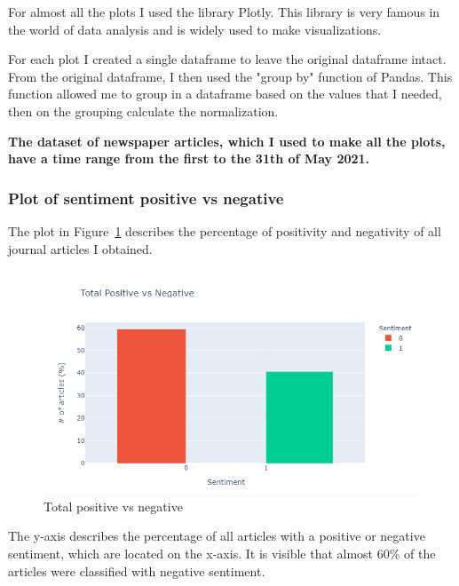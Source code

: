 For almost all the plots I used the library \gls{Plotly}. This library is very famous in the world of data analysis and is widely used to make visualizations. 

For each \gls{plot} I created a single dataframe to leave the original dataframe intact. From the original dataframe, I then used the "group by" function of \gls{Pandas}. This function allowed me to group in a dataframe based on the values that I needed, then on the grouping calculate the normalization.

\textbf{The dataset of newspaper articles, which I used to make all the plots, have a time range from the first to the 31th of May 2021.}

\subsubsection{Plot of sentiment positive vs negative} 
The \gls{plot} in Figure~\ref{fig:fig_tot} describes the percentage of positivity and negativity of all journal articles I obtained.
\begin{figure}[H]
\centering
\includegraphics[width=1\textwidth]{images/tot.png}
\caption{Total positive vs negative}
\label{fig:fig_tot}
\end{figure}
\FloatBarrier

The y-axis describes the percentage of all articles with a positive or negative sentiment, which are located on the x-axis. It is visible that almost 60\% of the articles were classified with negative sentiment.

